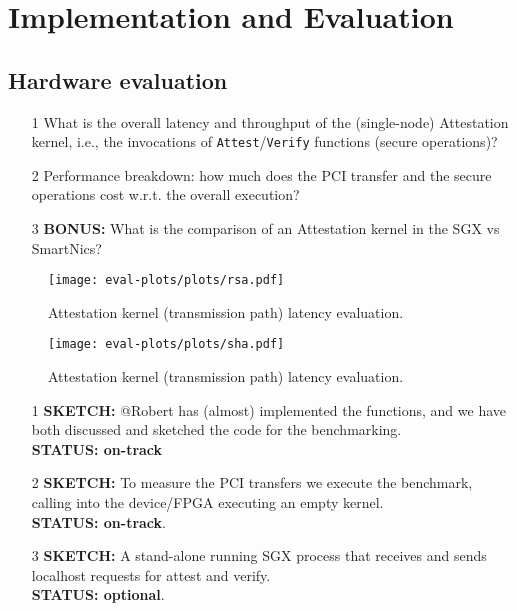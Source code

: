 \section{Implementation and Evaluation}
\label{sec:eval}
\subsection{Hardware evaluation}
\begin{itemize}
    \item[1] What is the overall latency and throughput of the (single-node) Attestation kernel, i.e., the invocations of \texttt{Attest}/\texttt{Verify} functions (secure operations)?
    \item[2] Performance breakdown: how much does the PCI transfer and the secure operations cost w.r.t. the overall execution?
    \item[3] {\bf \color{red} BONUS:} What is the comparison of an Attestation kernel in the SGX vs SmartNics? 
\end{itemize}

\begin{figure}[t!]
    \centering
    \texttt{[image: eval-plots/plots/rsa.pdf]}
    \caption{Attestation kernel (transmission path) latency evaluation.}
    \label{fig:initialization}
\end{figure}

\begin{figure}[t!]
    \centering
    \texttt{[image: eval-plots/plots/sha.pdf]}
    \caption{Attestation kernel (transmission path) latency evaluation.}
    \label{fig:initialization}
\end{figure}


{\color{blue} 
\begin{itemize}
    \item[1]  {\bf{SKETCH:}} @Robert has (almost) implemented the functions, and we have both discussed and sketched the code for the benchmarking. \\{\bf STATUS: on-track}
    \item[2]  {\bf{SKETCH:}} To measure the PCI transfers we execute the benchmark, calling into the device/FPGA executing an empty kernel.\\{\bf STATUS: on-track}.
    \item[3] \color{red} {\bf{SKETCH:}} A stand-alone running SGX process that receives and sends localhost requests for attest and verify.\\ {\bf STATUS: optional}. 
\end{itemize}
}

